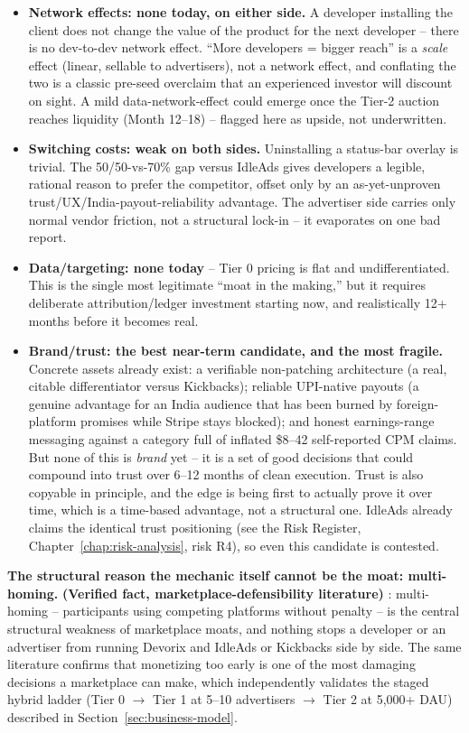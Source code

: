 \begin{itemize}
  \item \textbf{Network effects: none today, on either side.} A developer installing the client does not change the value of the product for the next developer -- there is no dev-to-dev network effect. ``More developers = bigger reach'' is a \emph{scale} effect (linear, sellable to advertisers), not a network effect, and conflating the two is a classic pre-seed overclaim that an experienced investor will discount on sight. A mild data-network-effect could emerge once the Tier-2 auction reaches liquidity (Month 12--18) -- flagged here as upside, not underwritten.
  \item \textbf{Switching costs: weak on both sides.} Uninstalling a status-bar overlay is trivial. The 50/50-vs-70\% gap versus IdleAds gives developers a legible, rational reason to prefer the competitor, offset only by an as-yet-unproven trust/UX/India-payout-reliability advantage. The advertiser side carries only normal vendor friction, not a structural lock-in -- it evaporates on one bad report.
  \item \textbf{Data/targeting: none today} -- Tier 0 pricing is flat and undifferentiated. This is the single most legitimate ``moat in the making,'' but it requires deliberate attribution/ledger investment starting now, and realistically 12+ months before it becomes real.
  \item \textbf{Brand/trust: the best near-term candidate, and the most fragile.} Concrete assets already exist: a verifiable non-patching architecture (a real, citable differentiator versus Kickbacks); reliable UPI-native payouts (a genuine advantage for an India audience that has been burned by foreign-platform promises while Stripe stays blocked); and honest earnings-range messaging against a category full of inflated \$8--42 self-reported CPM claims. But none of this is \emph{brand} yet -- it is a set of good decisions that could compound into trust over 6--12 months of clean execution. Trust is also copyable in principle, and the edge is being first to actually prove it over time, which is a time-based advantage, not a structural one. IdleAds already claims the identical trust positioning (see the Risk Register, Chapter~\ref{chap:risk-analysis}, risk R4), so even this candidate is contested.
\end{itemize}

\textbf{The structural reason the mechanic itself cannot be the moat: multi-homing.} \textbf{(Verified fact, marketplace-defensibility literature)} \cite{chen_coldstart_2021}: multi-homing -- participants using competing platforms without penalty -- is the central structural weakness of marketplace moats, and nothing stops a developer or an advertiser from running Devorix and IdleAds or Kickbacks side by side. The same literature confirms that monetizing too early is one of the most damaging decisions a marketplace can make, which independently validates the staged hybrid ladder (Tier 0 $\rightarrow$ Tier 1 at 5--10 advertisers $\rightarrow$ Tier 2 at 5{,}000+ DAU) described in Section~\ref{sec:business-model}.


